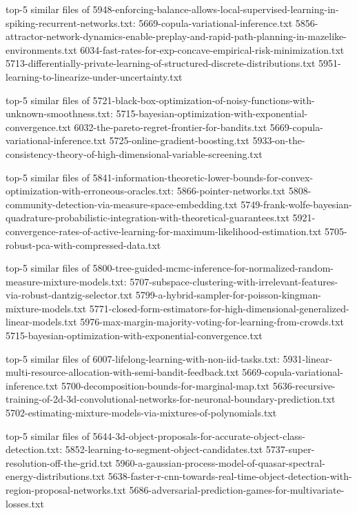 \documentclass[11pt]{article}
\begin{document}
top-5 similar files of
5948-enforcing-balance-allows-local-supervised-learning-in-spiking-recurrent-networks.txt:
5669-copula-variational-inference.txt
5856-attractor-network-dynamics-enable-preplay-and-rapid-path-planning-in-mazelike-environments.txt
6034-fast-rates-for-exp-concave-empirical-risk-minimization.txt
5713-differentially-private-learning-of-structured-discrete-distributions.txt
5951-learning-to-linearize-under-uncertainty.txt

top-5 similar files of
5721-black-box-optimization-of-noisy-functions-with-unknown-smoothness.txt:
5715-bayesian-optimization-with-exponential-convergence.txt
6032-the-pareto-regret-frontier-for-bandits.txt
5669-copula-variational-inference.txt 5725-online-gradient-boosting.txt
5933-on-the-consistency-theory-of-high-dimensional-variable-screening.txt

top-5 similar files of
5841-information-theoretic-lower-bounds-for-convex-optimization-with-erroneous-oracles.txt:
5866-pointer-networks.txt
5808-community-detection-via-measure-space-embedding.txt
5749-frank-wolfe-bayesian-quadrature-probabilistic-integration-with-theoretical-guarantees.txt
5921-convergence-rates-of-active-learning-for-maximum-likelihood-estimation.txt
5705-robust-pca-with-compressed-data.txt

top-5 similar files of
5800-tree-guided-mcmc-inference-for-normalized-random-measure-mixture-models.txt:
5707-subspace-clustering-with-irrelevant-features-via-robust-dantzig-selector.txt
5799-a-hybrid-sampler-for-poisson-kingman-mixture-models.txt
5771-closed-form-estimators-for-high-dimensional-generalized-linear-models.txt
5976-max-margin-majority-voting-for-learning-from-crowds.txt
5715-bayesian-optimization-with-exponential-convergence.txt

top-5 similar files of 6007-lifelong-learning-with-non-iid-tasks.txt:
5931-linear-multi-resource-allocation-with-semi-bandit-feedback.txt
5669-copula-variational-inference.txt
5700-decomposition-bounds-for-marginal-map.txt
5636-recursive-training-of-2d-3d-convolutional-networks-for-neuronal-boundary-prediction.txt
5702-estimating-mixture-models-via-mixtures-of-polynomials.txt

top-5 similar files of
5644-3d-object-proposals-for-accurate-object-class-detection.txt:
5852-learning-to-segment-object-candidates.txt
5737-super-resolution-off-the-grid.txt
5960-a-gaussian-process-model-of-quasar-spectral-energy-distributions.txt
5638-faster-r-cnn-towards-real-time-object-detection-with-region-proposal-networks.txt
5686-adversarial-prediction-games-for-multivariate-losses.txt
\end{document}

